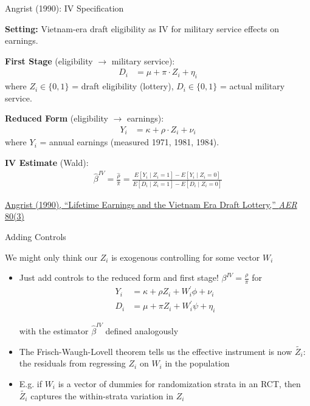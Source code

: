\documentclass{beamer}
\begin{document}

\begin{frame}{Angrist (1990): IV Specification}
{\small
\textbf{Setting:} Vietnam-era draft eligibility as IV for military service effects on earnings.\medskip

\textbf{First Stage} (eligibility $\to$ military service):
\vspace{-0.3cm}
\begin{align*}
D_i &= \mu + \pi \cdot Z_i + \eta_i
\end{align*}
\vspace{-0.5cm}
where $Z_i \in \{0,1\}$ = draft eligibility (lottery), $D_i \in \{0,1\}$ = actual military service.\medskip

\textbf{Reduced Form} (eligibility $\to$ earnings):
\vspace{-0.3cm}
\begin{align*}
Y_i &= \kappa + \rho \cdot Z_i + \nu_i
\end{align*}
\vspace{-0.5cm}
where $Y_i$ = annual earnings (measured 1971, 1981, 1984).\medskip

\textbf{IV Estimate} (Wald):
\vspace{-0.3cm}
\begin{align*}
\hat{\beta}^{IV} = \frac{\hat{\rho}}{\hat{\pi}} = \frac{E[Y_i \mid Z_i=1]-E[Y_i \mid Z_i=0]}{E[D_i \mid Z_i=1]-E[D_i \mid Z_i=0]}
\end{align*}
}
{\scriptsize \textcolor{asher}{\href{https://www.jstor.org/stable/2006669}{Angrist (1990), ``Lifetime Earnings and the Vietnam Era Draft Lottery,'' \emph{AER} 80(3)}}}
\end{frame}

\begin{frame}{Adding Controls}

We might only think our $Z_i$ is exogenous controlling for some vector $W_i$
\begin{itemize}
\item Just add controls to the reduced form and first stage! $\beta^{IV}=\frac{\rho}{\pi}$ for
\vspace{-0.3cm}
\begin{align*}
Y_i &= \kappa+ \rho Z_i + W_i^\prime\phi +  \nu_i \\
D_i &= \mu +\pi Z_i + W_i^\prime\psi + \eta_i
\end{align*}

\vspace{-0.2cm}
with the estimator $\hat\beta^{IV}$ defined analogously \pause{}\medskip
\item The Frisch-Waugh-Lovell theorem tells us the effective instrument is now $\tilde{Z_i}$: the residuals from regressing $Z_i$ on $W_i$ in the population\pause{}\medskip
\item E.g. if $W_i$ is a vector of dummies for randomization strata in an RCT, then $\tilde{Z_i}$ captures the within-strata variation in $Z_i$
\end{itemize}
\end{frame}
\end{document}
